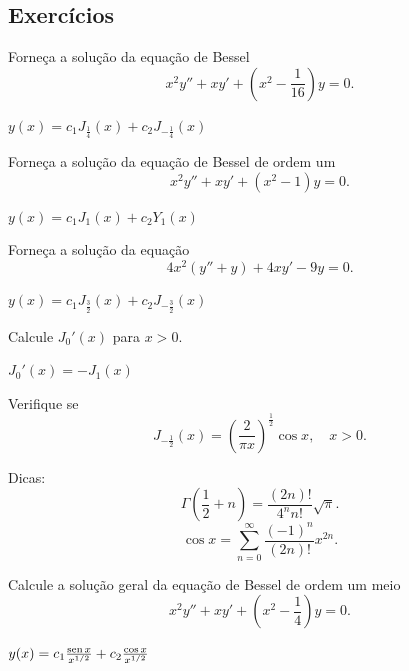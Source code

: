 \subsection*{Exercícios}

\begin{exer}
  Forneça a solução da equação de Bessel
  \begin{equation}
    x^2y'' + xy' + (x^2-\frac{1}{16})y = 0.
  \end{equation}
\end{exer}
\begin{resp}
  $y(x) = c_1J_{\frac{1}{4}}(x) + c_2J_{-\frac{1}{4}}(x)$
\end{resp}


\begin{exer}
  Forneça a solução da equação de Bessel de ordem um
  \begin{equation}
    x^2y'' + xy' + (x^2-1)y = 0.
  \end{equation}
\end{exer}
\begin{resp}
  $y(x) = c_1J_1(x) + c_2Y_1(x)$
\end{resp}

\begin{exer}
  Forneça a solução da equação
  \begin{equation}
    4x^2(y''+y) + 4xy' -9y = 0.
  \end{equation}
\end{exer}
\begin{resp}
  $y(x) = c_1J_{\frac{3}{2}}(x) + c_2J_{-\frac{3}{2}}(x)$
\end{resp}

\begin{exer}
  Calcule $J_0'(x)$ para $x>0$.
\end{exer}
\begin{resp}
  $J_0'(x)=-J_1(x)$
\end{resp}

\begin{exer}
  Verifique se
  \begin{equation}
    J_{-\frac{1}{2}}(x) = \left(\frac{2}{\pi x}\right)^{\frac{1}{2}}\cos x,\quad x>0.
  \end{equation}
\end{exer}
\begin{resp}
  Dicas:
  \begin{equation}
    \Gamma\left(\frac{1}{2}+n\right) = \frac{(2n)!}{4^nn!}\sqrt{\pi}.
  \end{equation}
  \begin{equation}
    \cos x = \sum_{n=0}^\infty \frac{(-1)^n}{(2n)!}x^{2n}.
  \end{equation}  
\end{resp}

\begin{exer}
  Calcule a solução geral da equação de Bessel de ordem um meio
  \begin{equation}
    x^2y'' + xy' + \left(x^2-\frac{1}{4}\right)y = 0.
  \end{equation}
\end{exer}
\begin{resp}
  $y(x) = c_1\frac{\operatorname{sen} x}{x^{1/2}} + c_2\frac{\cos x}{x^{1/2}}$
\end{resp}
